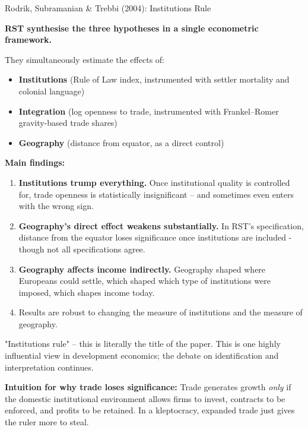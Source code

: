 \documentclass[10pt]{beamer}
\begin{document}
\begin{frame}[allowframebreaks]{Rodrik, Subramanian \& Trebbi (2004): Institutions Rule}

\textbf{RST synthesise the three hypotheses in a single econometric framework.}


They simultaneously estimate the effects of:
\begin{itemize}
\item \textbf{Institutions} (Rule of Law index, instrumented with settler mortality and colonial language)
\item \textbf{Integration} (log openness to trade, instrumented with Frankel--Romer gravity-based trade shares)
\item \textbf{Geography} (distance from equator, as a direct control)
\end{itemize}


\textbf{Main findings:}

\begin{enumerate}
\item \textbf{Institutions trump everything.} Once institutional quality is controlled for, trade openness is statistically insignificant -- and sometimes even enters with the wrong sign.
\item \textbf{Geography's direct effect weakens substantially.} In RST's specification, distance from the equator loses significance once institutions are included - though not all specifications agree.
\item \textbf{Geography affects income indirectly.} Geography shaped where Europeans could settle, which shaped which type of institutions were imposed, which shapes income today.
\item Results are robust to changing the measure of institutions and the measure of geography.
\end{enumerate}


\alert{"Institutions rule" -- this is literally the title of the paper. This is one highly influential view in development economics; the debate on identification and interpretation continues.}

\textbf{Intuition for why trade loses significance:}
Trade generates growth \emph{only} if the domestic institutional environment allows firms to invest, contracts to be enforced, and profits to be retained. In a kleptocracy, expanded trade just gives the ruler more to steal.
\end{frame}
\end{document}
